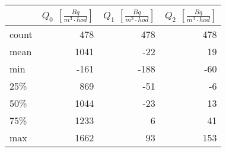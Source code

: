 \begin{tabular}{lrrr}
\toprule
{} &  $Q_0$ $\left[\si{\frac{Bq}{m^3\cdot hod}}\right]$ &  $Q_1$ $\left[\si{\frac{Bq}{m^3\cdot hod}}\right]$ &  $Q_2$ $\left[\si{\frac{Bq}{m^3\cdot hod}}\right]$ \\
\midrule
count &  478 &  478 & 478 \\
mean  & 1041 &  -22 &  19 \\
min   & -161 & -188 & -60 \\
25\%  &  869 &  -51 &  -6 \\
50\%  & 1044 &  -23 &  13 \\
75\%  & 1233 &    6 &  41 \\
max   & 1662 &   93 & 153 \\
\bottomrule
\end{tabular}
